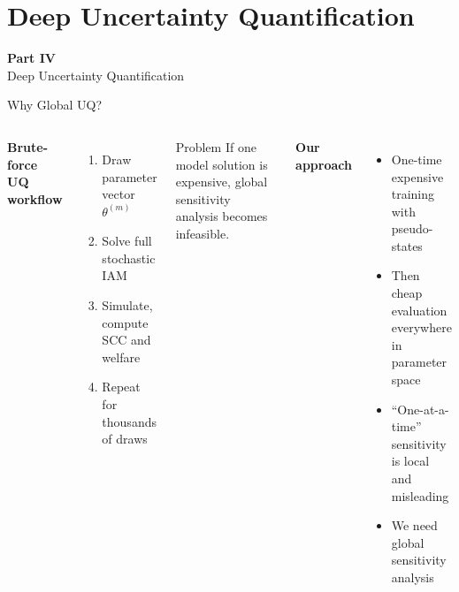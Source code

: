 \documentclass[aspectratio=169,11pt]{beamer}
\newcommand{\emphc}[1]{\textcolor{harvardcrimson}{#1}}
\begin{document}
\section{Deep Uncertainty Quantification}

\begin{frame}{}
\vfill
\begin{center}
{\Huge \textcolor{uzhblue}{\textbf{Part IV}}}\\[12pt]
{\LARGE Deep Uncertainty Quantification}
\end{center}
\vfill
\end{frame}

\begin{frame}{Why Global UQ?}
\begin{columns}[T]
\textbf{Brute-force UQ workflow}
\begin{enumerate}
    \item Draw parameter vector $\theta^{(m)}$
    \item Solve full stochastic IAM
    \item Simulate, compute SCC and welfare
    \item Repeat for thousands of draws
\end{enumerate}

\begin{alertblock}{Problem}
If one model solution is expensive, global sensitivity analysis becomes infeasible.
\end{alertblock}

\textbf{Our approach}
\begin{itemize}
    \item One-time expensive training with pseudo-states
    \item Then cheap evaluation \emphc{everywhere} in parameter space
    \item ``One-at-a-time'' sensitivity is local and misleading
    \item We need \emphc{global} sensitivity analysis
\end{itemize}
\end{columns}
\end{frame}
\end{document}
